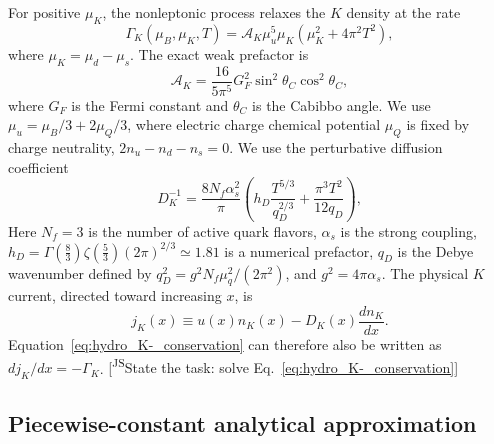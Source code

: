 \documentclass[10pt,superscriptaddress,
amsmath,aps,prc,twocolumn,nofootinbib,floatfix]{revtex4-1}
\newcommand{\JScom}[1]{\textsf{\color{violet} [\textsuperscript{JS}#1]}}
\begin{document}
For positive $\mu_K$, the nonleptonic process relaxes the $K$ density at the
rate~\cite{Madsen:1993xx}
\begin{equation}
 \Gamma_K(\mu_B,\mu_K,T)
 =\mathcal A_K\mu_u^5\mu_K
 \left(\mu_K^2+4\pi^2T^2\right),
\label{eq:hydro_exact_rate}
\end{equation}
where $\mu_K=\mu_d-\mu_s$.  The exact weak prefactor is
\begin{equation}
 \mathcal A_K=
 \frac{16}{5\pi^5}G_F^2
 \sin^2\theta_C\cos^2\theta_C,
\label{eq:hydro_exact_prefactor}
\end{equation}
where $G_F$ is the Fermi constant and $\theta_C$ is the Cabibbo angle.  We use
$\mu_u=\mu_B/3+2\mu_Q/3$, where electric charge chemical potential $\mu_Q$ is fixed by charge neutrality,
$2n_u-n_d-n_s=0$.
We use the perturbative diffusion coefficient~\cite{Haensel:1992zz}
\begin{equation}
 D_K^{-1}
 =
 \frac{8N_f\alpha_s^2}{\pi}
 \left(
 h_D\frac{T^{5/3}}{q_D^{2/3}}
 +\frac{\pi^3T^2}{12q_D}
 \right),
\label{eq:hydro_diffusion_coefficient}
\end{equation}
Here $N_f=3$ is the number of active quark flavors, $\alpha_s$ is the strong coupling, $h_D = \Gamma(\frac{8}{3})\zeta(\frac{5}{3})(2\pi)^{2/3} \simeq1.81$ is a numerical prefactor, $q_D$ is the
Debye wavenumber defined by $q_D^2=g^2N_f\mu_q^2/(2\pi^2)$, and $g^2=4\pi\alpha_s$.
The physical $K$ current, directed toward increasing $x$, is
\begin{equation}
 j_K(x)\equiv
 u(x)n_K(x)-D_K(x)\frac{dn_K}{dx}.
\label{eq:hydro_jK_definition}
\end{equation}
Equation~\eqref{eq:hydro_K-_conservation} can therefore also be written as
$dj_K/dx=-\Gamma_K$.\JScom{State the task: solve Eq.~\eqref{eq:hydro_K-_conservation}}

\subsection{Piecewise-constant analytical approximation}
\label{sec:hydro_analytic}
\end{document}
